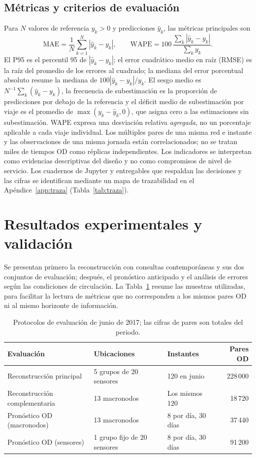 \documentclass[letterpaper,11pt]{article}
\newcommand{\MAE}{\mathrm{MAE}}
\newcommand{\WAPE}{\mathrm{WAPE}}
\begin{document}
\subsection{Métricas y criterios de evaluación}
Para $N$ valores de referencia $y_k>0$ y predicciones $\widehat y_k$, las métricas principales son
\begin{equation}
\MAE=\frac{1}{N}\sum_{k=1}^{N}|\widehat y_k-y_k|, \qquad
\WAPE=100\,\frac{\sum_k|\widehat y_k-y_k|}{\sum_k y_k}.
\end{equation}
El P95 es el percentil 95 de $|\widehat y_k-y_k|$; el error cuadrático medio en raíz (RMSE) es la raíz del promedio de los errores al cuadrado; la mediana del error porcentual absoluto resume la mediana de $100|\widehat y_k-y_k|/y_k$. El sesgo medio es $N^{-1}\sum_k(\widehat y_k-y_k)$, la frecuencia de subestimación es la proporción de predicciones por debajo de la referencia y el déficit medio de subestimación por viaje es el promedio de $\max(y_k-\widehat y_k,0)$, que asigna cero a las estimaciones sin subestimación. WAPE expresa una desviación relativa \emph{agregada}, no un porcentaje aplicable a cada viaje individual. Los múltiples pares de una misma red e instante y las observaciones de una misma jornada están correlacionados; no se tratan miles de tiempos OD como réplicas independientes. Los indicadores se interpretan como evidencias descriptivas del diseño y no como compromisos de nivel de servicio. Los cuadernos de Jupyter y entregables que respaldan las decisiones y las cifras se identifican mediante un mapa de trazabilidad en el Apéndice~\ref{app:traza} (Tabla~\ref{tab:traza}).

\section{Resultados experimentales y validación}
Se presentan primero la reconstrucción con consultas contemporáneas y sus dos conjuntos de evaluación; después, el pronóstico anticipado y el análisis de errores según las condiciones de circulación. La Tabla~\ref{tab:protocolos} resume las muestras utilizadas, para facilitar la lectura de métricas que no corresponden a los mismos pares OD ni al mismo horizonte de información.

\begin{table}[htbp]\centering\small
\caption{Protocolos de evaluación de junio de 2017; las cifras de pares son totales del periodo.}\label{tab:protocolos}
\begin{tabular}{@{}p{.26\linewidth}p{.25\linewidth}p{.20\linewidth}r@{}}\toprule
Evaluación & Ubicaciones & Instantes & Pares OD \\ \midrule
Reconstrucción principal & 5 grupos de 20 sensores & 120 en junio & 228\,000 \\
Reconstrucción complementaria & 13 macronodos & Los mismos 120 & 18\,720 \\
Pronóstico OD (macronodos) & 13 macronodos & 8 por día, 30 días & 37\,440 \\ 
Pronóstico OD (sensores) & 1 grupo fijo de 20 sensores & 8 por día, 30 días & 91\,200 \\ \bottomrule
\end{tabular}
\end{table}
\end{document}
